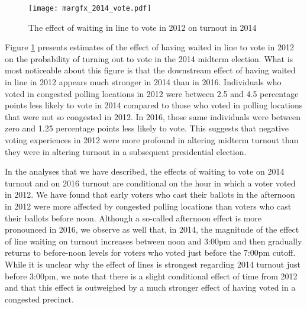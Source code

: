 \documentclass[12pt,titlepage]{article}
\begin{document}



\begin{figure}[!ht]
  \caption{The effect of waiting in line to vote in 2012 on turnout in 2014}
  \centering\texttt{[image: margfx\_2014\_vote.pdf]}
  \label{fig:prvoting2014}
\end{figure}

Figure \ref{fig:prvoting2014} presents estimates of the effect of
having waited in line to vote in 2012 on the probability of turning
out to vote in the 2014 midterm election. What is most noticeable
about this figure is that the downstream effect of having waited in
line in 2012 appears much stronger in 2014 than in 2016. Individuals
who voted in congested polling locations in 2012 were between 2.5 and
4.5 percentage points less likely to vote in 2014 compared to those
who voted in polling locations that were not so congested in 2012. In
2016, those same individuals were between zero and 1.25 percentage
points less likely to vote. This suggests that negative voting
experiences in 2012 were more profound in altering midterm turnout
than they were in altering turnout in a subsequent presidential
election.

In the analyses that we have described, the effects of waiting to vote
on 2014 turnout and on 2016 turnout are conditional on the hour in
which a voter voted in 2012.  We have found that early voters who cast
their ballots in the afternoon in 2012 were more affected by congested
polling locations than voters who cast their ballots before noon.
Although a so-called afternoon effect is more pronounced in 2016, we
observe as well that, in 2014, the magnitude of the effect of line
waiting on turnout increases between noon and 3:00pm and then
gradually returns to before-noon levels for voters who voted just
before the 7:00pm cutoff.  While it is unclear why the effect of lines
is strongest regarding 2014 turnout just before 3:00pm, we note that
there is a slight conditional effect of time from 2012 and that this
effect is outweighed by a much stronger effect of having voted in a
congested precinct.

\end{document}
